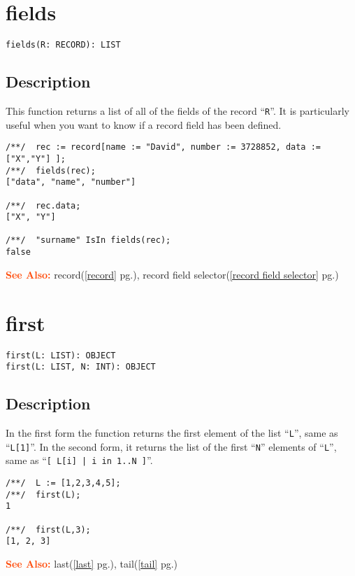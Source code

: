 \documentclass[a4paper]{mybook}
\newenvironment{command}{}{} %
\newcommand\SeeAlso{\par\textcolor{OrangeRed}{\textbf{\large See Also: }}}
\begin{document}
\section{fields}
\label{fields}
\begin{command} %


\begin{Verbatim}[label=syntax, rulecolor=\color{MidnightBlue},
frame=single]
fields(R: RECORD): LIST
\end{Verbatim}


\subsection*{Description}

This function returns a list of all of the fields of the record ``\verb&R&''.
It is particularly useful when you want to know if a record field
has been defined.
\begin{Verbatim}[label=example, rulecolor=\color{PineGreen}, frame=single]
/**/  rec := record[name := "David", number := 3728852, data := ["X","Y"] ];
/**/  fields(rec);
["data", "name", "number"]

/**/  rec.data;
["X", "Y"]

/**/  "surname" IsIn fields(rec);
false
\end{Verbatim}


\SeeAlso %
  record(\ref{record} pg.\pageref{record}), 
    record field selector(\ref{record field selector} pg.\pageref{record field selector})
\end{command} %

\section{first}
\label{first}
\begin{command} %


\begin{Verbatim}[label=syntax, rulecolor=\color{MidnightBlue},
frame=single]
first(L: LIST): OBJECT
first(L: LIST, N: INT): OBJECT
\end{Verbatim}


\subsection*{Description}

In the first form the function returns the first element of the list
``\verb&L&'', same as ``\verb&L[1]&''.
In the second form, it returns the list of the first ``\verb&N&'' elements of ``\verb&L&'',
same as ``\verb&[ L[i] | i in 1..N ]&''.
\begin{Verbatim}[label=example, rulecolor=\color{PineGreen}, frame=single]
/**/  L := [1,2,3,4,5];
/**/  first(L);
1

/**/  first(L,3);
[1, 2, 3]
\end{Verbatim}


\SeeAlso %
  last(\ref{last} pg.\pageref{last}), 
    tail(\ref{tail} pg.\pageref{tail})
\end{command} %
\end{document}
